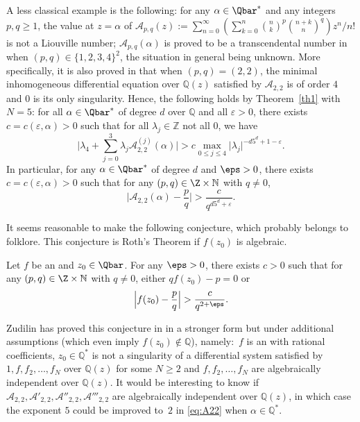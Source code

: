 A less classical example is the following: for any $\alpha\in \Qbar^*$ and any integers $p,q\ge 1$, the value at $z=\alpha$ of
$\mathcal{A}_{p,q}(z):=\sum_{n=0}^\infty (\sum_{k=0}^n \binom{n}{k}^p\binom{n+k}{n}^q)z^n/n!$ is not a Liouville number; $\mathcal{A}_{p,q}(\alpha)$ is proved to be a transcendental number in \cite[\S 4.6]{BRS2} when $(p,q)\in \{1,2,3,4\}^2$, the situation in general being unknown. More specifically, it is also proved in \cite[\S 4.6, Table\,1]{BRS2} that when $(p,q)=(2,2)$, the minimal inhomogeneous differential equation over $\mathbb Q(z)$ satisfied by $\mathcal{A}_{2,2}$ is of order $4$ and 0 is its only singularity. Hence, the following holds by Theorem~\ref{th1} with $N=5$: for all $\alpha\in \Qbar^*$ of degree $d$ over $\mathbb Q$ and all $\varepsilon>0$, there exists $c=c(\varepsilon, \alpha)>0$ such that for all $\lambda_j\in \mathbb Z$ not all 0, we have
\[
\Big\vert \lambda_4+\sum_{j=0}^3 \lambda_j \mathcal{A}_{2,2}^{(j)}(\alpha) \Big\vert >c
\max_{0\le j\le 4}\vert \lambda_j\vert^{ -d5^d+1-\varepsilon}.
\]
In particular, for any $\alpha\in \Qbar^*$ of degree $d$ and $\eps>0$, there exists $c=c(\varepsilon, \alpha)>0$ such that for any $(p,q)\in\Z\times \mathbb N$ with $q\neq0$,
\begin{equation}\label{eq:A22}
\Big\vert \mathcal{A}_{2,2}(\alpha) -\frac{p}{q}\Big\vert >\frac{c}{q^{
d5^d+\varepsilon}}.
\end{equation}

It seems reasonable to make the following conjecture, which probably belongs to folklore.
This conjecture is Roth's Theorem if $f(z_0)$ is algebraic.
\begin{conj} \label{conjmu2}
Let $f$ be an \Efunction and $z_0\in\Qbar$. For any $\eps>0$, there exists $c>0$ such that for any $(p,q)\in\Z\times \mathbb N$ with $q\neq 0$, either $q f(z_0)-p=0 $ or\vspace*{-3pt}
\[
\Big| f(z_0)-\frac p q \Big| > \frac c {q^{2+\eps}}.
\]
\end{conj}
Zudilin has proved this conjecture in \cite{zudilin} in a stronger form but under additional assumptions (which even imply $f(z_0)\notin \mathbb Q$), namely:~$f$ is an \Efunction with ratio\-nal coefficients, $z_0\in \mathbb Q^*$ is not a singularity of a differential system satisfied by~$1, f, f_2, \ldots, f_N$ over $\mathbb Q(z)$ for some $N\ge 2$ and $f, f_2, \ldots, f_N$ are algebraically independent over $\mathbb Q(z)$. It would be interesting to know if $\mathcal{A}_{2,2}, \mathcal{A}'_{2,2}, \mathcal{A}''_{2,2}, \mathcal{A}'''_{2,2}$ are alge\-braically independent over $\mathbb Q(z)$, in which case the exponent $5$ could be improved to~$2$ in \eqref{eq:A22} when $\alpha\in \mathbb Q^*$.

